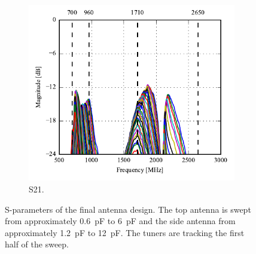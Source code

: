 \begin{figure}[htbp]
\begin{subfigure}{0.49\linewidth}
    \end{subfigure}
    \\
    \begin{subfigure}{0.49\linewidth}
        \includegraphics{img/tech_sol/monopole/highband/meas/final_tuner/S21.pdf}
        \caption{S21.}
    \end{subfigure}
    \caption{S-parameters of the final antenna design. The top antenna is swept from approximately \SI{0.6}{pF} to \SI{6}{pF} and the side antenna from approximately \SI{1.2}{pF} to \SI{12}{pF}. The tuners are tracking the first half of the sweep.} 
    \label{fig:final_sparams}
\end{figure}

